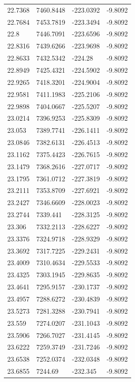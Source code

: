 \begin{table}[H]
\begin{tabular}{llll}
22.7368 & 7460.8448 & -223.0392 & -9.8092 \\
22.7684 & 7453.7819 & -223.3494 & -9.8092 \\
22.8 & 7446.7091 & -223.6596 & -9.8092 \\
22.8316 & 7439.6266 & -223.9698 & -9.8092 \\
22.8633 & 7432.5342 & -224.28 & -9.8092 \\
22.8949 & 7425.4321 & -224.5902 & -9.8092 \\
22.9265 & 7418.3201 & -224.9004 & -9.8092 \\
22.9581 & 7411.1983 & -225.2106 & -9.8092 \\
22.9898 & 7404.0667 & -225.5207 & -9.8092 \\
23.0214 & 7396.9253 & -225.8309 & -9.8092 \\
23.053 & 7389.7741 & -226.1411 & -9.8092 \\
23.0846 & 7382.6131 & -226.4513 & -9.8092 \\
23.1162 & 7375.4423 & -226.7615 & -9.8092 \\
23.1479 & 7368.2616 & -227.0717 & -9.8092 \\
23.1795 & 7361.0712 & -227.3819 & -9.8092 \\
23.2111 & 7353.8709 & -227.6921 & -9.8092 \\
23.2427 & 7346.6609 & -228.0023 & -9.8092 \\
23.2744 & 7339.441 & -228.3125 & -9.8092 \\
23.306 & 7332.2113 & -228.6227 & -9.8092 \\
23.3376 & 7324.9718 & -228.9329 & -9.8092 \\
23.3692 & 7317.7225 & -229.2431 & -9.8092 \\
23.4009 & 7310.4634 & -229.5533 & -9.8092 \\
23.4325 & 7303.1945 & -229.8635 & -9.8092 \\
23.4641 & 7295.9157 & -230.1737 & -9.8092 \\
23.4957 & 7288.6272 & -230.4839 & -9.8092 \\
23.5273 & 7281.3288 & -230.7941 & -9.8092 \\
23.559 & 7274.0207 & -231.1043 & -9.8092 \\
23.5906 & 7266.7027 & -231.4145 & -9.8092 \\
23.6222 & 7259.3749 & -231.7246 & -9.8092 \\
23.6538 & 7252.0374 & -232.0348 & -9.8092 \\
23.6855 & 7244.69 & -232.345 & -9.8092 \\

\end{tabular}
\end{table}
